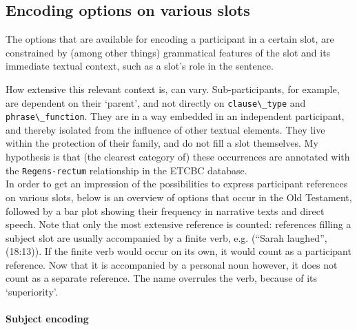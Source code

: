 \documentclass{report}
\newcommand{\mi}[1]{\lstinline{#1}}
\newcommand{\hebr}[1]{\hbox{\cjRL{#1}}}
\begin{document}
\subsection{Encoding options on various slots}
The options that are available for encoding a participant in a certain slot, are constrained by (among other things) grammatical features of the slot and its immediate textual context, such as a slot's role in the sentence.

How extensive this relevant context is, can vary. Sub-participants, for example, are dependent on their `parent', and not directly on \mi{clause\_type} and \mi{phrase\_function}. They are in a way embedded in an independent participant, and thereby isolated from the influence of other textual elements. They live within the protection of their family, and do not fill a slot themselves. My hypothesis is that (the clearest category of) these occurrences are annotated with the \mi{Regens-rectum} relationship in the ETCBC database.\\

In order to get an impression of the possibilities to express participant references on various slots, below is an overview of options that occur in the Old Testament, followed by a bar plot showing their frequency in narrative texts and direct speech. Note that only the most extensive reference is counted: references filling a subject slot are usually accompanied by a finite verb, e.g. \hebr{YXQH FRH} (``Sarah laughed'', (18:13)). If the finite verb would occur on its own, it would count as a participant reference. Now that it is accompanied by a personal noun however, it does not count as a separate reference. The name overrules the verb, because of its `superiority'.

\paragraph{Subject encoding}
\end{document}
